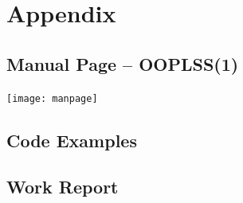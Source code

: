 \appendix
\part*{Appendix}

\chapter{Manual Page -- OOPLSS(1)}
\centerline{\texttt{[image: manpage]}}
%




\chapter{Code Examples}
\label{ctr:exampleCode}


\chapter{Work Report}


